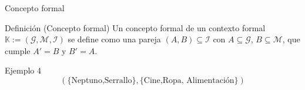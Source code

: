 \documentclass{beamer}
\newcommand{\M}{\mathcal{M}}
\newcommand{\I}{\mathcal{I}}
\newcommand{\G}{\mathcal{G}}
\begin{document}
    \begin{frame}{Concepto formal}
      \begin{block}{Definición (Concepto formal)} 
      \justifying
      Un concepto formal de un contexto formal $\mathbb{K}:=(\G,\M,\I)$ se define como una pareja $(A,B) \subseteq \I$ con $A\subseteq \G$, $B\subseteq \M$, que cumple $A'=B$ y $B'=A$.
      \end{block}
      \pause
      \begin{block}{Ejemplo 4 }
        $$(\{\text{Neptuno,Serrallo}\},\{\text{Cine,Ropa, Alimentación}\})$$
      \end{block}
       
       \begin{table}[H]
        \end{table}

  \end{frame}
\end{document}
